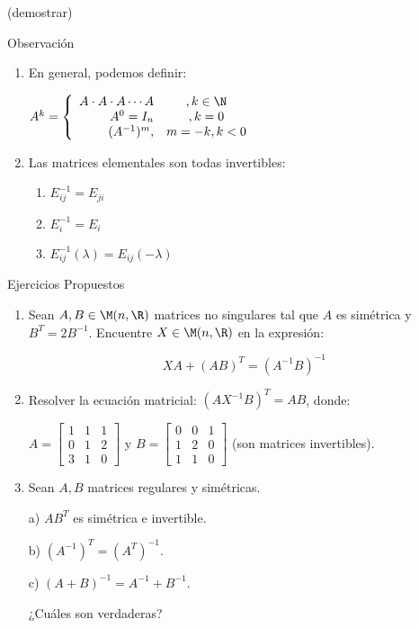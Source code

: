 (demostrar)


{Observación}


\begin{enumerate}
\item
En general, podemos definir:

$A^k = \left\{ \begin{array}{rcl}
A\cdot A \cdot A \cdots A &, k\in \N\\
A^0= I_n &, k=0 \\
(A^{-1} )^m, & m=-k, k<0
\end{array}\right.$

\item
Las matrices elementales son todas invertibles:
\begin{enumerate}
\item
$E_{ij}^{-1} = E_{ji}$

\item
$E_{i}^{-1} = E_{i}$

\item
$E_{ij}^{-1} (\lambda)= E_{ij}(-\lambda)$
\end{enumerate}
\end{enumerate}


{Ejercicios Propuestos}

\begin{enumerate}
\item
Sean  $A,B \in \M(n,\R)$ matrices no singulares tal que $A$ es simétrica y $B^T=2B^{-1}$. Encuentre $X \in \M(n,\R)$ en la expresión:

$$XA+(AB)^{T} = (A^{-1}B)^{-1}$$

\item
Resolver la ecuación matricial: $(AX^{-1}B)^T= AB$, donde:

$A= \begin{bmatrix}
1&1& 1 \\
0&1&2\\
3&1&0
\end{bmatrix}
$
y
$B= \begin{bmatrix}
0&0& 1 \\
1&2&0\\
1&1&0
\end{bmatrix}
$
(son matrices invertibles).
\item
Sean $A,B$ matrices regulares y simétricas. 

a) $AB^T$ es simétrica e invertible.

b) $(A^{-1})^T = (A^T)^{-1}$.

c) $(A+B)^{-1} = A^{-1}  +  B^{-1}.$

¿Cuáles son verdaderas?

\end{enumerate}



